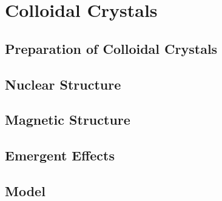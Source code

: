 \documentclass[\main/dresen_thesis.tex]{subfiles}
\begin{document}
\chapter{Colloidal Crystals}\label{ch:colloidalCrystals}

\section{Preparation of Colloidal Crystals}

\section{Nuclear Structure}

\section{Magnetic Structure}

\section{Emergent Effects}

\section{Model}
\end{document}
